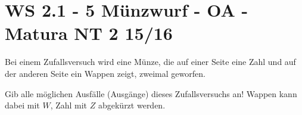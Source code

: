 \section{WS 2.1 - 5 Münzwurf - OA - Matura NT 2 15/16}

\begin{beispiel}{1} %
Bei einem Zufallsversuch wird eine Münze, die auf einer Seite eine Zahl und auf der anderen Seite ein Wappen zeigt, zweimal geworfen. \leer

Gib alle möglichen Ausfälle (Ausgänge) dieses Zufallsversuchs an! Wappen kann dabei mit
$W$, Zahl mit $Z$ abgekürzt werden.\leer

\end{beispiel}